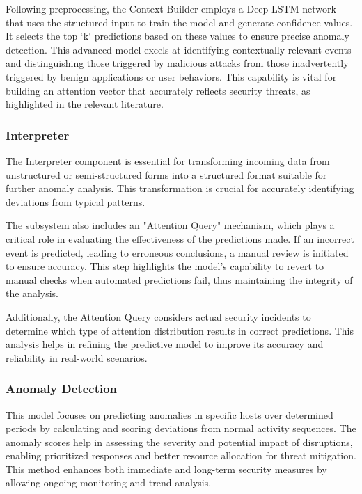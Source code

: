 Following preprocessing, the Context Builder employs a Deep LSTM network that uses the structured input to train the model and generate confidence values. It selects the top `k` predictions based on these values to ensure precise anomaly detection. This advanced model excels at identifying contextually relevant events and distinguishing those triggered by malicious attacks from those inadvertently triggered by benign applications or user behaviors. This capability is vital for building an attention vector that accurately reflects security threats, as highlighted in the relevant literature.

\subsubsection{Interpreter}

The Interpreter component is essential for transforming incoming data from unstructured or semi-structured forms into a structured format suitable for further anomaly analysis. This transformation is crucial for accurately identifying deviations from typical patterns.

The subsystem also includes an "Attention Query" mechanism, which plays a critical role in evaluating the effectiveness of the predictions made. If an incorrect event is predicted, leading to erroneous conclusions, a manual review is initiated to ensure accuracy. This step highlights the model's capability to revert to manual checks when automated predictions fail, thus maintaining the integrity of the analysis.

Additionally, the Attention Query considers actual security incidents to determine which type of attention distribution results in correct predictions. This analysis helps in refining the predictive model to improve its accuracy and reliability in real-world scenarios.

\subsubsection{Anomaly Detection}
This model focuses on predicting anomalies in specific hosts over determined periods by calculating and scoring deviations from normal activity sequences. The anomaly scores help in assessing the severity and potential impact of disruptions, enabling prioritized responses and better resource allocation for threat mitigation. This method enhances both immediate and long-term security measures by allowing ongoing monitoring and trend analysis.



